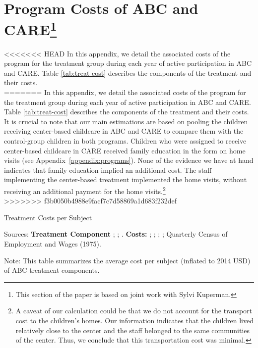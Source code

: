 \section[Program Costs of ABC and CARE]{Program Costs of ABC and CARE\footnote{This section of the paper is based on joint work with Sylvi Kuperman.}} \label{app:programcosts}

<<<<<<< HEAD
\noindent In this appendix, we detail the associated costs of the program for the treatment group during each year of active participation in ABC and CARE. Table \ref{tab:treat-cost}  describes the components of the treatment and their costs. \\

=======
\noindent In this appendix, we detail the associated costs of the program for the treatment group during each year of active participation in ABC and CARE. Table \ref{tab:treat-cost}  describes the components of the treatment and their costs. It is crucial to note that our main estimations are based on pooling the children receiving center-based childcare in ABC and CARE to compare them with the control-group children in both programs. Children who were assigned to receive center-based childcare in CARE received family education in the form on home visits (see Appendix~\ref{appendix:programs}). None of the evidence we have at hand indicates that family education implied an additional cost. The staff implementing the center-based treatment implemented the home visits, without receiving an additional payment for the home visits.\footnote{A caveat of our calculation could be that we do not account for the transport cost to the children's homes. Our information indicates that the children lived relatively close to the center and the staff belonged to the same communities of the center. Thus, we conclude that this transportation cost was minimal.} \\
>>>>>>> f3b0050b4988e9facf7c7d58869a1d683f232def

\begin{table}[H]
\caption{Treatment Costs per Subject} \label{tab:treat-cost}
\centering
\begin{adjustbox}{max width=\textwidth}
\begin{threeparttable}
\scriptsize

\begin{tablenotes}
\scriptsize
\item Sources: \textbf{Treatment Component} \cite{Ramey_Collier_etal_1976_CarolinaAbecedarianProject}; \cite{Ramey_McGinness_etal_1982_Abecedarianapproach}; \cite{Clarke_Campbell_1998_ABC_Comparison_ECRQ}. \textbf{Costs:} \cite{Barnett_Masse_2002_benefitcost}; \cite{FPGC_Progress-Report_1973}; \cite{Cutler_Meara_1998_Med-Costs_BOOK}; \cite{Helburn_1995_Childcare-Report}; Quarterly Census of Employment and Wages (1975).

\item Note: This table summarizes the average cost per subject (inflated to 2014 USD) of ABC treatment components.
\end{tablenotes}
\end{threeparttable}
\end{adjustbox}
\end{table}

